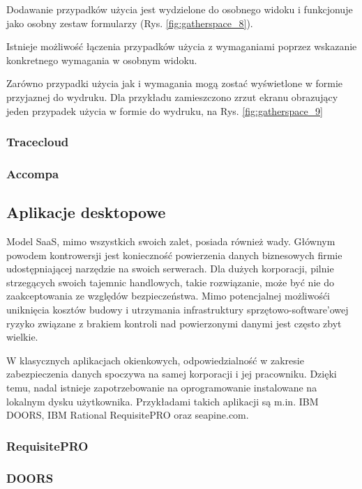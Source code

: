         Dodawanie przypadków użycia jest wydzielone do osobnego widoku i funkcjonuje jako osobny zestaw formularzy (Rys. \ref{fig:gatherspace_8}). 

        Istnieje możliwość łączenia przypadków użycia z wymaganiami poprzez wskazanie konkretnego wymagania w osobnym widoku. 

        Zarówno przypadki użycia jak i wymagania mogą zostać wyświetlone w formie przyjaznej do wydruku. Dla przykładu zamieszczono zrzut ekranu obrazujący jeden przypadek użycia w formie do wydruku, na Rys. \ref{fig:gatherspace_9}

         

      \subsubsection{Tracecloud}
      \subsubsection{Accompa}

    \subsection{Aplikacje desktopowe}

      Model SaaS, mimo wszystkich swoich zalet, posiada również wady. Głównym powodem kontrowersji jest konieczność powierzenia danych biznesowych firmie udostępniającej narzędzie na swoich serwerach. Dla dużych korporacji, pilnie strzegących swoich tajemnic handlowych, takie rozwiązanie, może być nie do zaakceptowania ze względów bezpieczeństwa. Mimo potencjalnej możliwośći uniknięcia kosztów budowy i utrzymania infrastruktury sprzętowo-software'owej ryzyko związane z brakiem kontroli nad powierzonymi danymi jest często zbyt wielkie. 

      W klasycznych aplikacjach okienkowych, odpowiedzialność w zakresie zabezpieczenia danych spoczywa na samej korporacji i jej pracowniku. Dzięki temu, nadal istnieje zapotrzebowanie na oprogramowanie instalowane na lokalnym dysku użytkownika. Przykładami takich aplikacji są m.in. IBM DOORS, IBM Rational RequisitePRO oraz seapine.com. 

      \subsubsection{RequisitePRO}
      \subsubsection{DOORS}

